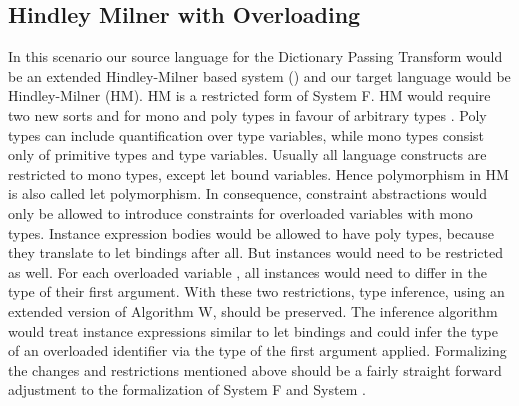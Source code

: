 \subsection{Hindley Milner with Overloading}
In this scenario our source language for the Dictionary Passing Transform would be an extended Hindley-Milner based system (\HMo) and our target language would be Hindley-Milner (HM). 
HM is a restricted form of System F. HM would require two new sorts  and  for mono and poly types in favour of arbitrary types . Poly types can include quantification over type variables, while mono types consist only of primitive types and type variables. 
Usually all language constructs are restricted to mono types, except let bound variables. 
Hence polymorphism in HM is also called let polymorphism.  
In consequence, constraint abstractions would only be allowed to introduce constraints for overloaded variables with mono types. 
Instance expression bodies would be allowed to have poly types, because they translate to let bindings after all.
But instances would need to be restricted as well. For each overloaded variable , all instances would need to differ in the type of their first argument.
With these two restrictions, type inference, using an extended version of Algorithm W, should be preserved. The inference algorithm would treat instance expressions similar to let bindings and could infer the type of an overloaded identifier via the type of the first argument applied.
Formalizing the changes and restrictions mentioned above should be a fairly straight forward adjustment to the formalization of System F and System \Fo.

